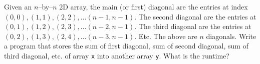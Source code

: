 Given an $n$--by--$n$ 2D array,
the main (or first) diagonal are the entries at
index
$(0,0),
(1,1),
(2,2),...(n-1,n-1)$.
The second diagonal are the entries at
$(0, 1),
(1, 2),
(2, 3), ...
(n-2, n-1)$.
The third diagonal are the entries at
$(0, 2),
(1, 3),
(2, 4), ...
(n-3, n-1)$.
Etc.
The above are $n$ diagonals.
Write a program that stores the sum of first diagonal,
sum of second diagonal,
sum of third diagonal, etc. of array \verb!x!
into another array \verb!y!.
What is the runtime?
